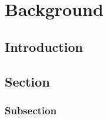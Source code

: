 \chapter{Background}

\section{Introduction}

\lipsum[1-4]

\section{Section}

\lipsum[2-4]

\subsection{Subsection}

\lipsum[2-4]